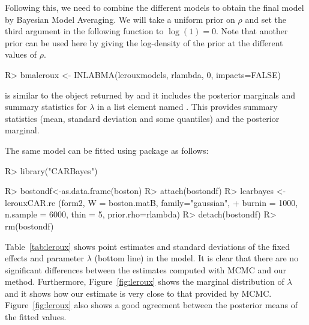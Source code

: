 \documentclass[article]{jss}
\begin{document}
Following this, we need to combine the different models to obtain the final
model by Bayesian Model Averaging. We will take a uniform prior on $\rho$ and
set the third argument in the following function to $\log(1)=0$. Note that
another prior can be used here by giving the log-density of the prior at the
different values of $\rho$.



\begin{Schunk}
\begin{Sinput}
R> bmaleroux <- INLABMA(lerouxmodels, rlambda, 0, impacts=FALSE)
\end{Sinput}
\end{Schunk}


\noindent
{} is similar to the object returned by  and it
includes the posterior marginals and summary statistics for $\lambda$
in a list element named . This provides summary statistics (mean,
standard deviation and some quantiles) and the posterior marginal.

The same model can be fitted using package  \citep{CARBayes:2013}
as follows:

\begin{Schunk}
\begin{Sinput}
R> library("CARBayes")
\end{Sinput}
\end{Schunk}
\begin{Schunk}
\begin{Sinput}
R> bostondf<-as.data.frame(boston)
R> attach(bostondf)
R> lcarbayes <-  lerouxCAR.re (form2, W = boston.matB, family="gaussian",
+     burnin = 1000,  n.sample = 6000, thin = 5, prior.rho=rlambda)
R> detach(bostondf)
R> rm(bostondf)
\end{Sinput}
\end{Schunk}


Table~\ref{tab:leroux} shows point estimates and standard deviations of the
fixed effects and parameter $\lambda$ (bottom line) in the model. It is clear
that there are no significant differences between the estimates computed with
MCMC and our method.  Furthermore, Figure~\ref{fig:leroux} shows the marginal
distribution of $\lambda$ and it shows how our estimate is very close to that
provided by MCMC. 
Figure~\ref{fig:leroux} also shows a good agreement between the posterior
means of the fitted values. 

\end{document}
